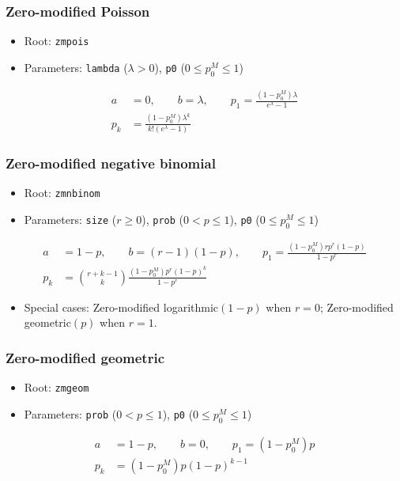 \documentclass[x11names]{article}
\newcommand{\code}[1]{\texttt{#1}}
\begin{document}
\subsubsection{Zero-modified Poisson}

\begin{itemize}
\item Root: \code{zmpois}
\item Parameters: \code{lambda} ($\lambda > 0$),
  \code{p0} ($0 \leq p_0^M \leq 1$)
\end{itemize}
\begin{align*}
  a &= 0, \qquad b = \lambda, \qquad
      p_1 = \frac{(1 - p_0^M) \lambda}{e^\lambda - 1} \\
  p_k &= \frac{(1 - p_0^M) \lambda^k}{k! (e^\lambda - 1)}
\end{align*}

\subsubsection{Zero-modified negative binomial}

\begin{itemize}
\item Root: \code{zmnbinom}
\item Parameters: \code{size} ($r \geq 0$),
  \code{prob} ($0 < p \leq 1$),
  \code{p0} ($0 \leq p_0^M \leq 1$)
\end{itemize}
\begin{align*}
  a &= 1 - p, \qquad b = (r - 1)(1 - p), \qquad
      p_1 = \frac{(1 - p_0^M) r p^r (1 - p)}{1 - p^r} \\
  p_k &= \binom{r+k-1}{k} \frac{(1 - p_0^M) p^r (1 - p)^k}{1 - p^r}
\end{align*}

\begin{itemize}
\item Special cases: Zero-modified logarithmic$(1 - p)$ when $r = 0$;
  Zero-modified geometric$(p)$ when $r = 1$.
\end{itemize}

\subsubsection{Zero-modified geometric}

\begin{itemize}
\item Root: \code{zmgeom}
\item Parameters: \code{prob} ($0 < p \leq 1$),
  \code{p0} ($0 \leq p_0^M \leq 1$)
\end{itemize}
\begin{align*}
  a &= 1 - p, \qquad b = 0, \qquad p_1 = (1 - p_0^M) p \\
  p_k &= (1 - p_0^M) p (1 - p)^{k - 1}
\end{align*}
\end{document}
